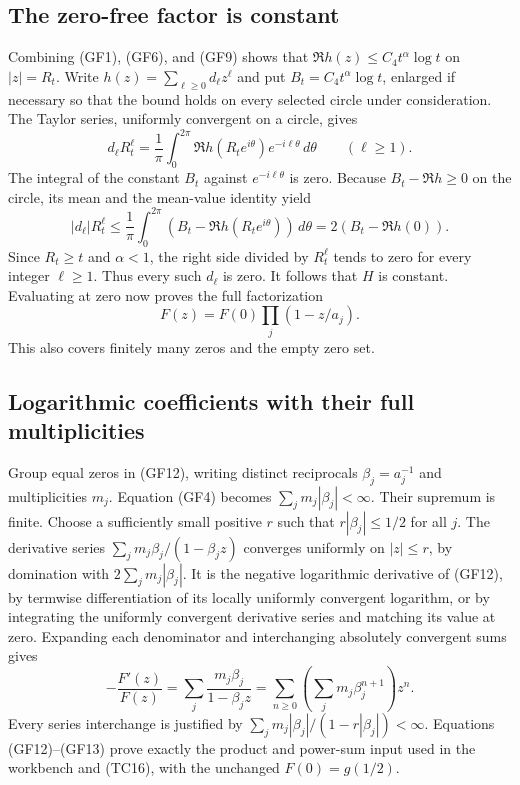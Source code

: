 \documentclass{article}
\begin{document}
\subsection{The zero-free factor is constant}
Combining (GF1), (GF6), and (GF9) shows that
$\Re h(z)\le C_4t^\alpha\log t$ on $|z|=R_t$.
Write $h(z)=\sum_{\ell\ge0}d_\ell z^\ell$ and put
$B_t=C_4t^\alpha\log t$, enlarged if necessary so that the bound
holds on every selected circle under consideration.
The Taylor series, uniformly convergent on a circle, gives
\[
d_\ell R_t^\ell=
\frac1{\pi}\int_0^{2\pi}\Re h(R_te^{i\theta})
e^{-i\ell\theta}\,d\theta\qquad(\ell\ge1).
\tag{GF10}
\]
The integral of the constant $B_t$ against
$e^{-i\ell\theta}$ is zero. Because
$B_t-\Re h\ge0$ on the circle, its mean and the mean-value
identity yield
\[
|d_\ell|R_t^\ell
\le\frac1\pi\int_0^{2\pi}(B_t-\Re h(R_te^{i\theta}))\,d\theta
=2(B_t-\Re h(0)).
\tag{GF11}
\]
Since $R_t\ge t$ and $\alpha<1$, the right side divided by
$R_t^\ell$ tends to zero for every integer $\ell\ge1$.
Thus every such $d_\ell$ is zero. It follows that $H$ is
constant. Evaluating at zero now proves the full factorization
\[
F(z)=F(0)\prod_j(1-z/a_j).
\tag{GF12}
\]
This also covers finitely many zeros and the empty zero set.

\subsection{Logarithmic coefficients with their full multiplicities}
Group equal zeros in (GF12), writing distinct reciprocals
$\beta_j=a_j^{-1}$ and multiplicities $m_j$. Equation (GF4)
becomes $\sum_jm_j|\beta_j|<\infty$.
Their supremum is finite. Choose a sufficiently small positive
$r$ such that $r|\beta_j|\le1/2$ for all $j$.
The derivative series
$\sum_jm_j\beta_j/(1-\beta_j z)$ converges uniformly on
$|z|\le r$, by domination with $2\sum_jm_j|\beta_j|$.
It is the negative logarithmic derivative of (GF12), by
termwise differentiation of its locally uniformly convergent
logarithm, or by integrating the uniformly convergent derivative
series and matching its value at zero. Expanding each denominator
and interchanging absolutely convergent sums gives
\[
-\frac{F'(z)}{F(z)}
=\sum_j\frac{m_j\beta_j}{1-\beta_jz}
=\sum_{n\ge0}
\left(\sum_jm_j\beta_j^{n+1}\right)z^n .
\tag{GF13}
\]
Every series interchange is justified by
$\sum_jm_j|\beta_j|/(1-r|\beta_j|)<\infty$.
Equations (GF12)--(GF13) prove exactly the product and power-sum
input used in the workbench and (TC16), with the unchanged
$F(0)=g(1/2)$.
\end{document}
